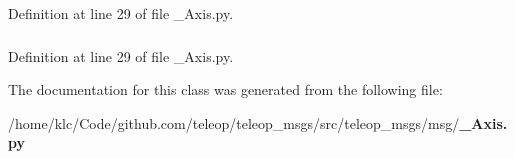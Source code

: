 Definition at line 29 of file \_\-Axis.py.

\subsubsection[{value}]{}\label{classteleop__msgs_1_1msg_1_1__Axis_1_1Axis_a8450ff8eb2486bcf150a0e0512460f1f}


Definition at line 29 of file \_\-Axis.py.



The documentation for this class was generated from the following file:\begin{DoxyCompactItemize}
\item 
/home/klc/Code/github.com/teleop/teleop\_\-msgs/src/teleop\_\-msgs/msg/{\bf \_\-Axis.py}\end{DoxyCompactItemize}
